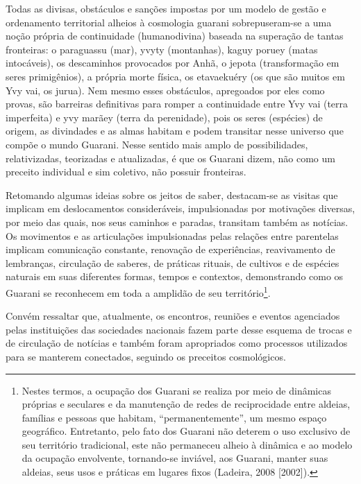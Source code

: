 \documentclass{article}
\begin{document}
Todas as divisas, obst\'aculos e san\c{c}\~oes impostas por um modelo de
gest\~ao e ordenamento territorial alheios \`a cosmologia guarani
sobrepuseram-se a uma no\c{c}\~ao pr\'opria de continuidade
(humanodivina) baseada na supera\c{c}\~ao de tantas fronteiras: o
paraguassu (mar), yvyty (montanhas), kaguy poruey (matas intoc\'aveis),
os descaminhos provocados por Anh\~a, o jepota (transforma\c{c}\~ao em
seres primig\^enios), a pr\'opria morte f\'isica, os etavaeku\'ery (os
que s\~ao muitos em Yvy vai, os jurua).  Nem mesmo esses obst\'aculos,
apregoados por eles como provas, s\~ao barreiras definitivas para
romper a continuidade entre Yvy vai (terra imperfeita) e yvy mar\~aey
(terra da perenidade), pois os seres (esp\'ecies) de origem, as
divindades e as almas habitam e podem transitar nesse universo que
comp\~oe o mundo Guarani. Nesse sentido mais amplo de possibilidades,
relativizadas, teorizadas e atualizadas, \'e que os Guarani dizem,
n\~ao como um preceito individual e sim coletivo, n\~ao possuir
fronteiras. 

Retomando algumas ideias sobre os jeitos de saber, destacam-se as
visitas que implicam em deslocamentos consider\'aveis, impulsionadas
por motiva\c{c}\~oes diversas, por meio das quais, nos seus caminhos e
paradas, transitam tamb\'em as not\'icias. Os movimentos e as
articula\c{c}\~oes impulsionadas pelas rela\c{c}\~oes entre parentelas
implicam comunica\c{c}\~ao constante, renova\c{c}\~ao de
experi\^encias, reavivamento de lembran\c{c}as, circula\c{c}\~ao de
saberes, de pr\'aticas rituais, de cultivos e de esp\'ecies naturais em
suas diferentes formas, tempos e contextos, demonstrando como os
Guarani se reconhecem em toda a amplid\~ao de seu
territ\'orio\footnote{ Nestes termos, a ocupa\c{c}\~ao dos Guarani se
realiza por meio de din\^amicas pr\'oprias e seculares e da
manuten\c{c}\~ao de redes de reciprocidade entre aldeias, fam\'ilias e
pessoas que habitam,
{\textquotedblleft}permanentemente{\textquotedblright}, um mesmo
espa\c{c}o geogr\'afico. Entretanto, pelo fato dos Guarani n\~ao
deterem o uso exclusivo de seu territ\'orio tradicional, este n\~ao
permaneceu alheio \`a din\^amica e ao modelo da ocupa\c{c}\~ao
envolvente, tornando-se invi\'avel, aos Guarani, manter suas aldeias,
seus usos e pr\'aticas em lugares fixos (Ladeira, 2008 [2002]). }. 

Conv\'em ressaltar que, atualmente, os encontros, reuni\~oes e eventos
agenciados pelas institui\c{c}\~oes das sociedades nacionais fazem
parte desse esquema de trocas e de circula\c{c}\~ao de not\'icias e
tamb\'em foram apropriados como processos utilizados para se manterem
conectados, seguindo os preceitos cosmol\'ogicos.
\end{document}
